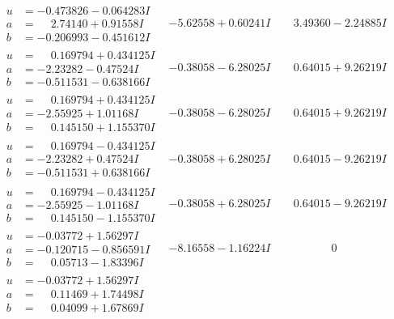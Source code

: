 \documentclass[1p]{elsarticle_modified}
\theoremstyle{definition}
\begin{document}
$$\begin{array}{c|c|c}
\begin{aligned}
u &= -0.473826 - 0.064283 I \\
a &= \phantom{-}2.74140 + 0.91558 I \\
b &= -0.206993 - 0.451612 I\end{aligned}
 & -5.62558 + 0.60241 I & \phantom{-}3.49360 - 2.24885 I \\ \hline\begin{aligned}
u &= \phantom{-}0.169794 + 0.434125 I \\
a &= -2.23282 - 0.47524 I \\
b &= -0.511531 - 0.638166 I\end{aligned}
 & -0.38058 - 6.28025 I & \phantom{-}0.64015 + 9.26219 I \\ \hline\begin{aligned}
u &= \phantom{-}0.169794 + 0.434125 I \\
a &= -2.55925 + 1.01168 I \\
b &= \phantom{-}0.145150 + 1.155370 I\end{aligned}
 & -0.38058 - 6.28025 I & \phantom{-}0.64015 + 9.26219 I \\ \hline\begin{aligned}
u &= \phantom{-}0.169794 - 0.434125 I \\
a &= -2.23282 + 0.47524 I \\
b &= -0.511531 + 0.638166 I\end{aligned}
 & -0.38058 + 6.28025 I & \phantom{-}0.64015 - 9.26219 I \\ \hline\begin{aligned}
u &= \phantom{-}0.169794 - 0.434125 I \\
a &= -2.55925 - 1.01168 I \\
b &= \phantom{-}0.145150 - 1.155370 I\end{aligned}
 & -0.38058 + 6.28025 I & \phantom{-}0.64015 - 9.26219 I \\ \hline\begin{aligned}
u &= -0.03772 + 1.56297 I \\
a &= -0.120715 - 0.856591 I \\
b &= \phantom{-}0.05713 - 1.83396 I\end{aligned}
 & -8.16558 - 1.16224 I & \phantom{-0.000000 } 0 \\ \hline\begin{aligned}
u &= -0.03772 + 1.56297 I \\
a &= \phantom{-}0.11469 + 1.74498 I \\
b &= \phantom{-}0.04099 + 1.67869 I\end{aligned}

\end{array}$$
\end{document}
